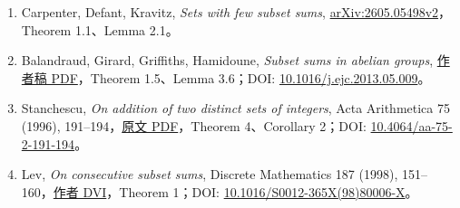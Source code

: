 \documentclass[
  11pt,
  a4paper,
]{article}
\providecommand{\tightlist}{%
  \setlength{\itemsep}{0pt}\setlength{\parskip}{0pt}}
\begin{document}
\fontsize{9}{11}\selectfont
\begin{enumerate}
\def\labelenumi{\arabic{enumi}.}
\tightlist
\item
  Carpenter, Defant, Kravitz, \emph{Sets with few subset sums},
  \href{https://arxiv.org/html/2605.05498v2}{arXiv:2605.05498v2}，Theorem
  1.1、Lemma 2.1。
\item
  Balandraud, Girard, Griffiths, Hamidoune, \emph{Subset sums in abelian
  groups}, \href{https://arxiv.org/pdf/1112.1929}{作者稿 PDF}，Theorem
  1.5、Lemma 3.6；DOI:
  \href{https://doi.org/10.1016/j.ejc.2013.05.009}{10.1016/j.ejc.2013.05.009}。
\item
  Stanchescu, \emph{On addition of two distinct sets of integers}, Acta
  Arithmetica 75 (1996),
  191--194，\href{https://matwbn.icm.edu.pl/ksiazki/aa/aa75/aa7526.pdf}{原文
  PDF}，Theorem 4、Corollary 2；DOI:
  \href{https://doi.org/10.4064/aa-75-2-191-194}{10.4064/aa-75-2-191-194}。
\item
  Lev, \emph{On consecutive subset sums}, Discrete Mathematics 187
  (1998),
  151--160，\href{https://math.haifa.ac.il/seva/Papers/coblis.dvi}{作者
  DVI}，Theorem 1；DOI:
  \href{https://doi.org/10.1016/S0012-365X(98)80006-X}{10.1016/S0012-365X(98)80006-X}。
\end{enumerate}
\end{document}
